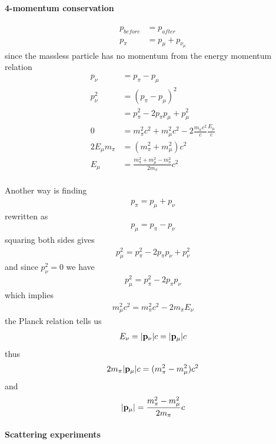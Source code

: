 \documentclass[../main.tex]{subfiles}
\begin{document}
\paragraph{4-momentum conservation}
\begin{align*}
    p_{before} &= p_{after} \\
    p_{\pi} &= p_{\mu} + p_{\nu_\mu}
\end{align*}
since the massless particle has no momentum from the energy momentum relation
\begin{align*}
    p_\nu &= p_\pi - p_\mu \\
    p_\nu^2 &= (p_\pi - p_\mu)^2 \\
    &= p_\pi^2 - 2p_\pi p_\mu + p_\mu^2 \\
    0 &= m_\pi^2 c^2 + m_\mu^2 c^2 - 2\frac{m_\pi c^2}{c} \frac{E_\mu}{c} \\
    2E_\mu m_\pi &= (m_\pi^2 + m_\mu^2) c^2 \\
    E_\mu &= \frac{m_\pi^2 + m_\mu^2 - m_\nu^2}{2m_\pi} c^2 \\
\end{align*}

Another way is finding
\begin{align*}
    p_\pi = p_\mu + p_\nu
\end{align*}
rewritten as
\begin{align*}
    p_\mu = p_\pi - p_\nu
\end{align*}
squaring both sides gives
\begin{align*}
    p_\mu^2 = p_\pi^2 - 2p_\pi p_\nu + p_\nu^2
\end{align*}
and since $p_\nu^2 = 0$ we have
\begin{align*}
    p_\mu^2 = p_\pi^2 - 2p_\pi p_\nu
\end{align*}
which implies
\begin{align*}
    m_\mu^2 c^2 = m_\pi^2 c^2 - 2m_\pi E_\nu
\end{align*}
the Planck relation tells us
\begin{align*}
    E_\nu = \abs{\vb{p}_\nu} c = \abs{\vb{p}_\mu} c
\end{align*}
thus
\begin{align*}
    2 m_\pi \abs{\vb{p}_\mu} c = (m_\pi^2 - m_\mu^2) c^2
\end{align*}
and
\begin{align*}
    \abs{\vb{p}_\mu} = \frac{m_\pi^2 - m_\mu^2}{2m_\pi} c
\end{align*}

\paragraph{Scattering experiments}
\end{document}
